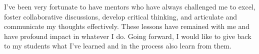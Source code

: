 \documentclass[a4paper]{article}
\begin{document}
I've been very fortunate to have mentors who have always challenged me to excel, foster collaborative discussions, develop critical thinking, and articulate and communicate my thoughts effectively. 
These lessons have remained with me and have profound impact in whatever I do.  Going forward, I would like to give back to my students what I've learned and in the process also learn from them.
\end{document}

